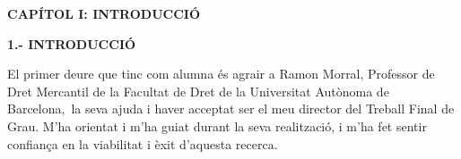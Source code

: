 \documentclass[12pt]{article}
\begin{document}
\vspace{\baselineskip}

\vspace{\baselineskip}

\vspace{\baselineskip}

\vspace{\baselineskip}

\vspace{\baselineskip}

\vspace{\baselineskip}

\vspace{\baselineskip}

\vspace{\baselineskip}

\vspace{\baselineskip}

\vspace{\baselineskip}

\vspace{\baselineskip}

\vspace{\baselineskip}

\vspace{\baselineskip}

\vspace{\baselineskip}

\vspace{\baselineskip}
\begin{Center}
{\fontsize{16pt}{19.2pt}\selectfont \textbf{CAPÍTOL I: INTRODUCCIÓ}\par}
\end{Center}\par


\vspace{\baselineskip}

\vspace{\baselineskip}
\begin{justify}
\textbf{1.- INTRODUCCIÓ}
\end{justify}\par


\vspace{\baselineskip}
\begin{justify}
El primer deure que tinc com alumna és agrair a Ramon Morral, Professor de Dret Mercantil de la Facultat de Dret de la Universitat Autònoma de Barcelona,\  la seva ajuda i haver acceptat ser el meu director del Treball Final de Grau. M’ha orientat i m’ha guiat durant la seva realització, i m’ha fet sentir confiança en la viabilitat i èxit d’aquesta recerca.
\end{justify}\par
\end{document}
